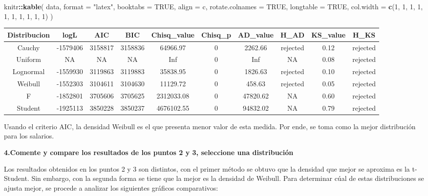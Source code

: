 \documentclass[
]{article}
\newenvironment{Shaded}{\begin{snugshade}}{\end{snugshade}}
\newcommand{\AttributeTok}[1]{\textcolor[rgb]{0.13,0.29,0.53}{#1}}
\newcommand{\ConstantTok}[1]{\textcolor[rgb]{0.56,0.35,0.01}{#1}}
\newcommand{\DecValTok}[1]{\textcolor[rgb]{0.00,0.00,0.81}{#1}}
\newcommand{\FunctionTok}[1]{\textcolor[rgb]{0.13,0.29,0.53}{\textbf{#1}}}
\newcommand{\NormalTok}[1]{#1}
\newcommand{\SpecialCharTok}[1]{\textcolor[rgb]{0.81,0.36,0.00}{\textbf{#1}}}
\newcommand{\StringTok}[1]{\textcolor[rgb]{0.31,0.60,0.02}{#1}}
\begin{document}
\begin{Shaded}
\begin{Highlighting}[]
\NormalTok{knitr}\SpecialCharTok{::}\FunctionTok{kable}\NormalTok{(}
\NormalTok{  data,}
  \AttributeTok{format =} \StringTok{"latex"}\NormalTok{,}
  \AttributeTok{booktabs =} \ConstantTok{TRUE}\NormalTok{,}
  \AttributeTok{align =} \StringTok{\textquotesingle{}c\textquotesingle{}}\NormalTok{,}
  \AttributeTok{rotate.colnames =} \ConstantTok{TRUE}\NormalTok{,}
  \AttributeTok{longtable =} \ConstantTok{TRUE}\NormalTok{,}
  \AttributeTok{col.width =} \FunctionTok{c}\NormalTok{(}\DecValTok{1}\NormalTok{, }\DecValTok{1}\NormalTok{, }\DecValTok{1}\NormalTok{, }\DecValTok{1}\NormalTok{, }\DecValTok{1}\NormalTok{, }\DecValTok{1}\NormalTok{, }\DecValTok{1}\NormalTok{, }\DecValTok{1}\NormalTok{, }\DecValTok{1}\NormalTok{, }\DecValTok{1}\NormalTok{)}
\NormalTok{)}
\end{Highlighting}
\end{Shaded}

\begin{longtable}{cccccccccc}
\toprule
Distribucion & logL & AIC & BIC & Chisq\_value & Chisq\_p & AD\_value & H\_AD & KS\_value & H\_KS\\
\midrule
Cauchy & -1579406 & 3158817 & 3158836 & 64966.97 & 0 & 2262.66 & rejected & 0.12 & rejected\\
Uniform & NA & NA & NA & Inf & 0 & Inf & NA & 0.08 & rejected\\
Lognormal & -1559930 & 3119863 & 3119883 & 35838.95 & 0 & 1826.63 & rejected & 0.10 & rejected\\
Weibull & -1552303 & 3104611 & 3104630 & 11129.72 & 0 & 458.63 & rejected & 0.05 & rejected\\
F & -1852801 & 3705606 & 3705625 & 2312033.08 & 0 & 47820.62 & NA & 0.60 & rejected\\
\addlinespace
Student & -1925113 & 3850228 & 3850237 & 4676102.55 & 0 & 94832.02 & NA & 0.79 & rejected\\
\bottomrule
\end{longtable}

Usando el criterio AIC, la densidad Weibull es el que presenta menor
valor de esta medida. Por ende, se toma como la mejor distribución para
los salarios.

\textbf{4.Comente y compare los resultados de los puntos 2 y 3,
seleccione una distribución}

Los resultados obtenidos en los puntos 2 y 3 son distintos, con el
primer método se obtuvo que la densidad que mejor se aproxima es la
t-Student. Sin embargo, con la segunda forma se tiene que la mejor es la
densidad de Weibull. Para determinar cúal de estas distribuciones se
ajusta mejor, se procede a analizar los siguientes gráficos
comparativos:
\end{document}
